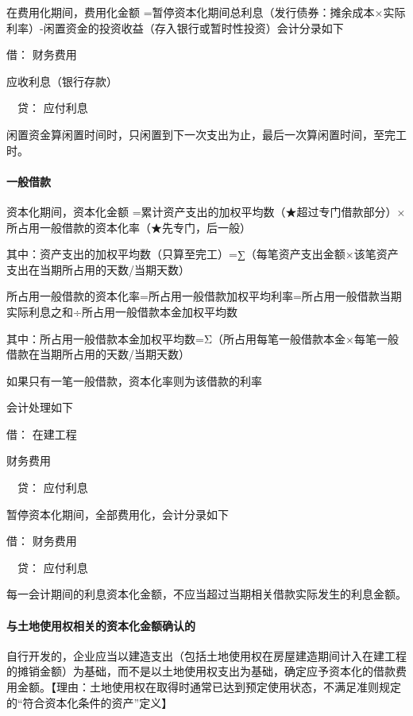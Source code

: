 \documentclass[UTF8,12pt]{ctexart}
\newenvironment{Dr}{\noindent 借：}{\par}
\newenvironment{Cr}{\noindent \ \ 贷：}{\par}
\numberwithin{equation}{section} %
\numberwithin{figure}{section}
\numberwithin{table}{section}
\begin{document}
	在费用化期间，费用化金额
	=暂停资本化期间总利息（发行债券：摊余成本×实际利率）-闲置资金的投资收益（存入银行或暂时性投资）会计分录如下
	
	\begin{Dr}
		财务费用
		
		应收利息（银行存款）
	\end{Dr}
	\begin{Cr}
		应付利息
	\end{Cr}
	
	闲置资金算闲置时间时，只闲置到下一次支出为止，最后一次算闲置时间，至完工时。
	
	\paragraph{一般借款}
	资本化期间，资本化金额
	=累计资产支出的加权平均数（★超过专门借款部分）×所占用一般借款的资本化率（★先专门，后一般）
	
	其中：资产支出的加权平均数（只算至完工）=∑（每笔资产支出金额×该笔资产支出在当期所占用的天数/当期天数）
	
	所占用一般借款的资本化率=所占用一般借款加权平均利率=所占用一般借款当期实际利息之和÷所占用一般借款本金加权平均数
	
	其中：所占用一般借款本金加权平均数=Σ（所占用每笔一般借款本金×每笔一般借款在当期所占用的天数/当期天数）
	
	如果只有一笔一般借款，资本化率则为该借款的利率
	
	会计处理如下
	
	\begin{Dr}
		在建工程
		
		财务费用
	\end{Dr}
	\begin{Cr}
		应付利息
	\end{Cr}

	暂停资本化期间，全部费用化，会计分录如下
	
	\begin{Dr}
		财务费用
	\end{Dr}
	\begin{Cr}
		应付利息
	\end{Cr}

	每一会计期间的利息资本化金额，不应当超过当期相关借款实际发生的利息金额。
	
	\paragraph{与土地使用权相关的资本化金额确认的}
	自行开发的，企业应当以建造支出（包括土地使用权在房屋建造期间计入在建工程的摊销金额）为基础，而不是以土地使用权支出为基础，确定应予资本化的借款费用金额。【理由：土地使用权在取得时通常已达到预定使用状态，不满足准则规定的“符合资本化条件的资产”定义】
	
\end{document}
